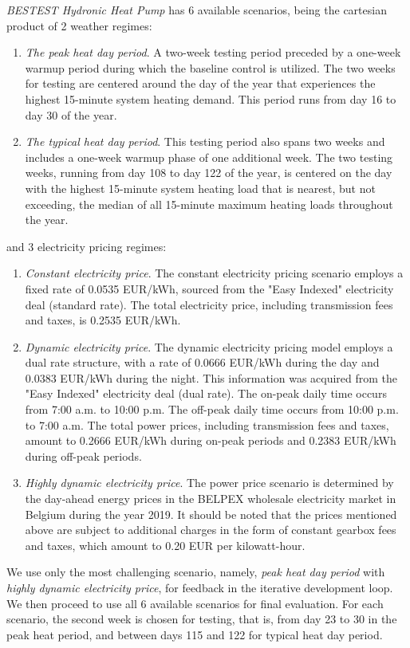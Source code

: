\emph{BESTEST Hydronic Heat Pump} has 6 available scenarios, being the cartesian product of 2 weather regimes:
\begin{enumerate}
    \item \emph{The peak heat day period}. A two-week testing period preceded by a one-week warmup period during which the baseline control is utilized. The two weeks for testing are centered around the day of the year that experiences the highest 15-minute system heating demand. This period runs from day 16 to day 30 of the year.
    \item \emph{The typical heat day period}. This testing period also spans two weeks and includes a one-week warmup phase of one additional week. The two testing weeks, running from day 108 to day 122 of the year, is centered on the day with the highest 15-minute system heating load that is nearest, but not exceeding, the median of all 15-minute maximum heating loads throughout the year.
\end{enumerate}
and 3 electricity pricing regimes: 
\begin{enumerate}
    \item \emph{Constant electricity price}. The constant electricity pricing scenario employs a fixed rate of 0.0535 EUR/kWh, sourced from the "Easy Indexed" electricity deal (standard rate).  The total electricity price, including transmission fees and taxes, is 0.2535 EUR/kWh.
    \item \emph{Dynamic electricity price}. The dynamic electricity pricing model employs a dual rate structure, with a rate of 0.0666 EUR/kWh during the day and 0.0383 EUR/kWh during the night. This information was acquired from the "Easy Indexed" electricity deal (dual rate).   The on-peak daily time occurs from 7:00 a.m. to 10:00 p.m.   The off-peak daily time occurs from 10:00 p.m. to 7:00 a.m.  The total power prices, including transmission fees and taxes, amount to 0.2666 EUR/kWh during on-peak periods and 0.2383 EUR/kWh during off-peak periods.
    \item \emph{Highly dynamic electricity price}. The power price scenario is determined by the day-ahead energy prices in the BELPEX wholesale electricity market in Belgium during the year 2019.  It should be noted that the prices mentioned above are subject to additional charges in the form of constant gearbox fees and taxes, which amount to 0.20 EUR per kilowatt-hour.
\end{enumerate} 

We use only the most challenging scenario, namely, \emph{peak heat day period} with \emph{highly dynamic electricity price}, for feedback in the iterative development loop. 
We then proceed to use all 6 available scenarios for final evaluation. 
For each scenario, the second week is chosen for testing, that is, from day 23 to 30 in the peak heat period, and between days 115 and 122 for typical heat day period.

